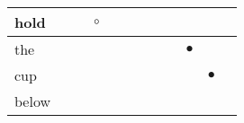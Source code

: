 \documentclass[landscape]{article}
\newcommand{\ssp}{\hspace{2pt}}
\newcommand{\mex}{\cellcolor{g}$\bullet$}
\newcommand{\map}{\cellcolor{y}$\boldsymbol\circ$}
\begin{document}
\begin{tabular}{|l|p{10pt}|p{10pt}|p{10pt}|p{10pt}|p{10pt}|p{10pt}|p{10pt}|p{10pt}|p{10pt}|p{10pt}|p{10pt}|}
\hline
\ssp \cellcolor{ref2}hold \ssp&\hspace{2pt}&\hspace{2pt}&\hspace{2pt}\map&\hspace{2pt}&\hspace{2pt}&\hspace{2pt}&\hspace{2pt}&\hspace{2pt}&\hspace{2pt}&\hspace{2pt}&\hspace{2pt}\\
\hline
\ssp \cellcolor{ref8}the \ssp&\hspace{2pt}&\hspace{2pt}&\hspace{2pt}&\hspace{2pt}&\hspace{2pt}&\hspace{2pt}&\hspace{2pt}&\hspace{2pt}&\hspace{2pt}\mex&\hspace{2pt}&\hspace{2pt}\\
\hline
\ssp \cellcolor{ref9}cup \ssp&\hspace{2pt}&\hspace{2pt}&\hspace{2pt}&\hspace{2pt}&\hspace{2pt}&\hspace{2pt}&\hspace{2pt}&\hspace{2pt}&\hspace{2pt}&\hspace{2pt}\mex&\hspace{2pt}\\
\hline
\ssp below \ssp&\hspace{2pt}&\hspace{2pt}&\hspace{2pt}&\hspace{2pt}&\hspace{2pt}&\hspace{2pt}&\hspace{2pt}&\hspace{2pt}&\hspace{2pt}&\hspace{2pt}&\hspace{2pt}\\

\end{tabular}
\end{document}
